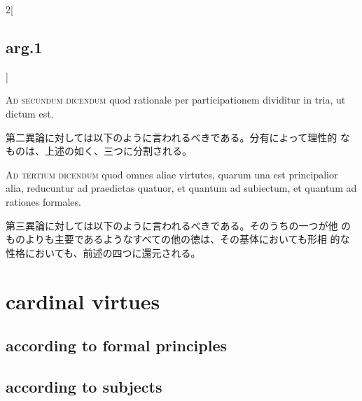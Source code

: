 \documentclass[paper=a4paper,fontsize=10pt,jafontsize=9pt,titlepage]{jlreq}
\begin{document}
\begin{paracol}{2}[\subsection{arg.1}]
\switchcolumn*[\subsection{ad.2}]

{\scshape Ad secundum dicendum} quod rationale per participationem
dividitur in tria, ut dictum est.

\switchcolumn

第二異論に対しては以下のように言われるべきである。分有によって理性的
 なものは、上述の如く、三つに分割される。

\switchcolumn*[\subsection{ad.3}]

{\scshape Ad tertium dicendum} quod omnes aliae virtutes, quarum una
est principalior alia, reducuntur ad praedictas quatuor, et quantum ad
subiectum, et quantum ad rationes formales.

\switchcolumn

第三異論に対しては以下のように言われるべきである。そのうちの一つが他
 のものよりも主要であるようなすべての他の徳は、その基体においても形相
 的な性格においても、前述の四つに還元される。

\end{paracol}
\newpage
\section{cardinal virtues}\label{schema:cardinal_virtues}
\subsection{according to formal principles}
\schema
{}
{
{
{
}
}
}

\vspace{2em}
\subsection{according to subjects}
\schema
{}
{
{
}
}
\end{document}

